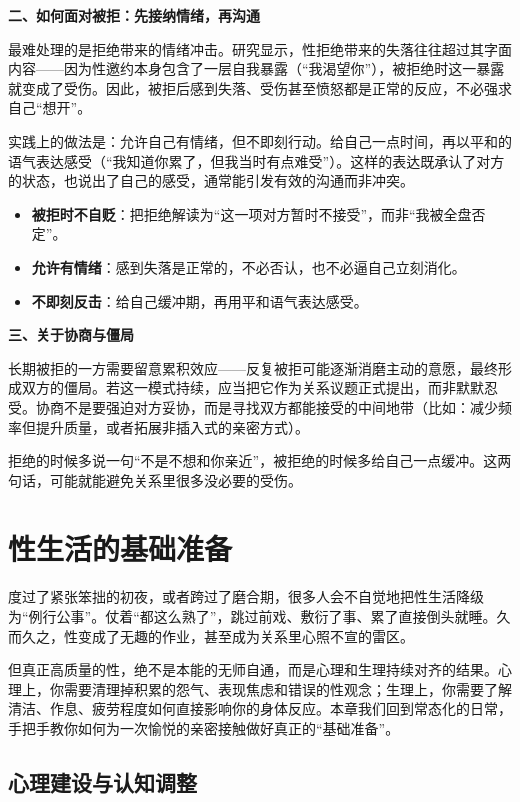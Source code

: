 \documentclass[12pt,UTF8]{ctexbook}
\begin{document}
\textbf{二、如何面对被拒：先接纳情绪，再沟通}

最难处理的是拒绝带来的情绪冲击。研究显示，性拒绝带来的失落往往超过其字面内容——因为性邀约本身包含了一层自我暴露（“我渴望你”），被拒绝时这一暴露就变成了受伤。因此，被拒后感到失落、受伤甚至愤怒都是正常的反应，不必强求自己“想开”。

实践上的做法是：允许自己有情绪，但不即刻行动。给自己一点时间，再以平和的语气表达感受（“我知道你累了，但我当时有点难受”）。这样的表达既承认了对方的状态，也说出了自己的感受，通常能引发有效的沟通而非冲突。

\begin{itemize}
\item \textbf{被拒时不自贬}：把拒绝解读为“这一项对方暂时不接受”，而非“我被全盘否定”。
\item \textbf{允许有情绪}：感到失落是正常的，不必否认，也不必逼自己立刻消化。
\item \textbf{不即刻反击}：给自己缓冲期，再用平和语气表达感受。
\end{itemize}

\textbf{三、关于协商与僵局}

长期被拒的一方需要留意累积效应——反复被拒可能逐渐消磨主动的意愿，最终形成双方的僵局。若这一模式持续，应当把它作为关系议题正式提出，而非默默忍受。协商不是要强迫对方妥协，而是寻找双方都能接受的中间地带（比如：减少频率但提升质量，或者拓展非插入式的亲密方式）。

\begin{tcolorbox}[colback=pink!5!white,colframe=red!50!black,title=贴心小叮咛]
拒绝的时候多说一句“不是不想和你亲近”，被拒绝的时候多给自己一点缓冲。这两句话，可能就能避免关系里很多没必要的受伤。
\end{tcolorbox}

\chapter{性生活的基础准备}

度过了紧张笨拙的初夜，或者跨过了磨合期，很多人会不自觉地把性生活降级为“例行公事”。仗着“都这么熟了”，跳过前戏、敷衍了事、累了直接倒头就睡。久而久之，性变成了无趣的作业，甚至成为关系里心照不宣的雷区。

但真正高质量的性，绝不是本能的无师自通，而是心理和生理持续对齐的结果。心理上，你需要清理掉积累的怨气、表现焦虑和错误的性观念；生理上，你需要了解清洁、作息、疲劳程度如何直接影响你的身体反应。本章我们回到常态化的日常，手把手教你如何为一次愉悦的亲密接触做好真正的“基础准备”。

\section{心理建设与认知调整}
\end{document}
